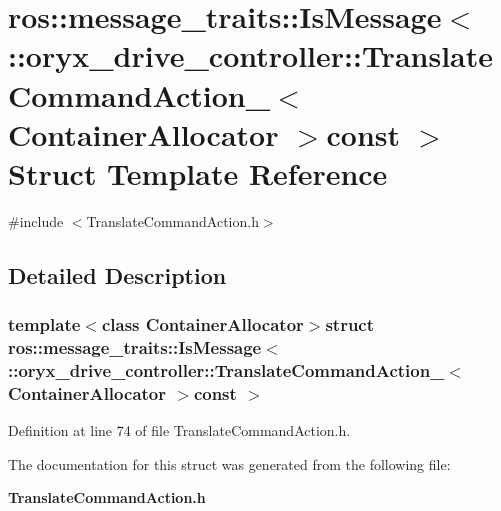 \section{ros\-:\-:message\-\_\-traits\-:\-:\-Is\-Message$<$ \-:\-:oryx\-\_\-drive\-\_\-controller\-:\-:\-Translate\-Command\-Action\-\_\-$<$ \-Container\-Allocator $>$const $>$ \-Struct \-Template \-Reference}
\label{structros_1_1message__traits_1_1IsMessage_3_01_1_1oryx__drive__controller_1_1TranslateCommandActd220de1f72f208a7fadc0641a1d5c69c}


{\ttfamily \#include $<$\-Translate\-Command\-Action.\-h$>$}



\subsection{\-Detailed \-Description}
\subsubsection*{template$<$class Container\-Allocator$>$struct ros\-::message\-\_\-traits\-::\-Is\-Message$<$ \-::oryx\-\_\-drive\-\_\-controller\-::\-Translate\-Command\-Action\-\_\-$<$ Container\-Allocator $>$const  $>$}



\-Definition at line 74 of file \-Translate\-Command\-Action.\-h.



\-The documentation for this struct was generated from the following file\-:\begin{DoxyCompactItemize}
\item 
{\bf \-Translate\-Command\-Action.\-h}\end{DoxyCompactItemize}
